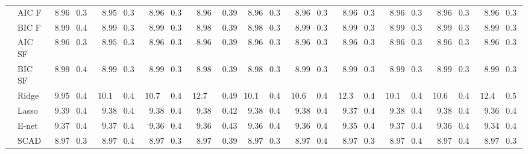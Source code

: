 \begin{tabular}{ll|ll|llllll|llllll|llllll}
	& AIC F  & $\phantom{0}8.96$ & $0.39$ & $\phantom{0}8.95$ & $0.39$ & $\phantom{0}8.96$ & $0.39$ & $\phantom{0}8.96$ & $\phantom{0}0.39$ & $\phantom{0}8.96$ & $0.39$ & $\phantom{0}8.96$ & $0.39$ & $\phantom{0}8.96$ & $0.39$ & $\phantom{0}8.96$ & $0.39$ & $\phantom{0}8.96$ & $0.39$ & $\phantom{0}8.96$ & $0.39$ \\
	& BIC F  & $\phantom{0}8.99$ & $0.40$ & $\phantom{0}8.99$ & $0.39$ & $\phantom{0}8.99$ & $0.39$ & $\phantom{0}8.98$ & $\phantom{0}0.39$ & $\phantom{0}8.98$ & $0.39$ & $\phantom{0}8.99$ & $0.39$ & $\phantom{0}8.99$ & $0.39$ & $\phantom{0}8.99$ & $0.39$ & $\phantom{0}8.99$ & $0.39$ & $\phantom{0}8.99$ & $0.39$ \\
	& AIC SF  & $\phantom{0}8.96$ & $0.39$ & $\phantom{0}8.95$ & $0.39$ & $\phantom{0}8.96$ & $0.39$ & $\phantom{0}8.96$ & $\phantom{0}0.39$ & $\phantom{0}8.96$ & $0.39$ & $\phantom{0}8.96$ & $0.39$ & $\phantom{0}8.96$ & $0.39$ & $\phantom{0}8.96$ & $0.39$ & $\phantom{0}8.96$ & $0.39$ & $\phantom{0}8.96$ & $0.39$ \\
	& BIC SF  & $\phantom{0}8.99$ & $0.40$ & $\phantom{0}8.99$ & $0.39$ & $\phantom{0}8.99$ & $0.39$ & $\phantom{0}8.98$ & $\phantom{0}0.39$ & $\phantom{0}8.98$ & $0.39$ & $\phantom{0}8.99$ & $0.39$ & $\phantom{0}8.99$ & $0.39$ & $\phantom{0}8.99$ & $0.39$ & $\phantom{0}8.99$ & $0.39$ & $\phantom{0}8.99$ & $0.39$ \\
	& Ridge  & $\phantom{0}9.95$ & $0.42$ & $10.16$ & $0.44$ & $10.72$ & $0.44$ & $12.72$ & $\phantom{0}0.49$ & $10.11$ & $0.43$ & $10.62$ & $0.43$ & $12.34$ & $0.47$ & $10.11$ & $0.42$ & $10.61$ & $0.42$ & $12.47$ & $0.50$ \\
	& Lasso  & $\phantom{0}9.39$ & $0.42$ & $\phantom{0}9.38$ & $0.42$ & $\phantom{0}9.38$ & $0.42$ & $\phantom{0}9.38$ & $\phantom{0}0.42$ & $\phantom{0}9.38$ & $0.41$ & $\phantom{0}9.38$ & $0.41$ & $\phantom{0}9.37$ & $0.41$ & $\phantom{0}9.38$ & $0.42$ & $\phantom{0}9.38$ & $0.42$ & $\phantom{0}9.36$ & $0.42$ \\
	& E-net  & $\phantom{0}9.37$ & $0.44$ & $\phantom{0}9.37$ & $0.43$ & $\phantom{0}9.36$ & $0.43$ & $\phantom{0}9.36$ & $\phantom{0}0.43$ & $\phantom{0}9.36$ & $0.43$ & $\phantom{0}9.36$ & $0.43$ & $\phantom{0}9.35$ & $0.43$ & $\phantom{0}9.37$ & $0.43$ & $\phantom{0}9.36$ & $0.43$ & $\phantom{0}9.34$ & $0.43$ \\
	& SCAD  & $\phantom{0}8.97$ & $0.39$ & $\phantom{0}8.97$ & $0.40$ & $\phantom{0}8.97$ & $0.39$ & $\phantom{0}8.97$ & $\phantom{0}0.39$ & $\phantom{0}8.97$ & $0.39$ & $\phantom{0}8.97$ & $0.40$ & $\phantom{0}8.97$ & $0.39$ & $\phantom{0}8.97$ & $0.40$ & $\phantom{0}8.97$ & $0.40$ & $\phantom{0}8.97$ & $0.39$ \\

\end{tabular}
